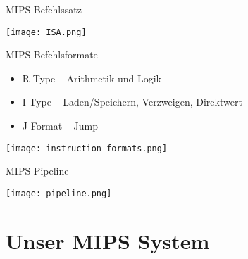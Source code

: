 \begin{frame}{MIPS Befehlssatz}
\begin{center}
\texttt{[image: ISA.png]}
\end{center}

\end{frame}

\begin{frame}{MIPS Befehlsformate}
\begin{itemize}
	\item R-Type -- Arithmetik und Logik
       \item I-Type -- Laden/Speichern, Verzweigen, Direktwert
       \item J-Format -- Jump
\end{itemize}

\begin{center}
\texttt{[image: instruction-formats.png]}
\end{center}
\end{frame}

\begin{frame}{MIPS Pipeline}

\begin{center}

\texttt{[image: pipeline.png]}
\end{center}


\end{frame}

\section{Unser MIPS System}

